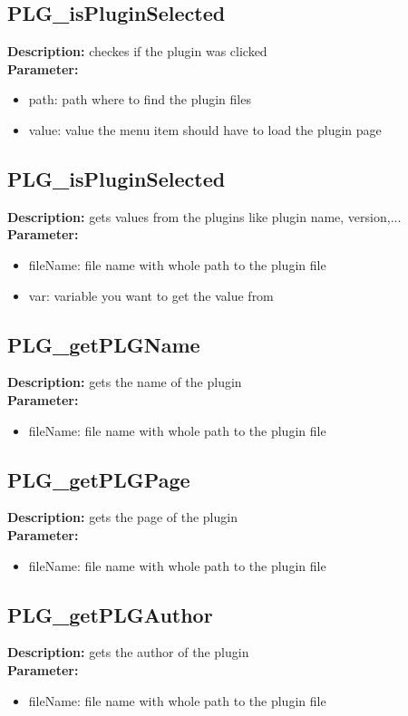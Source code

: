 \subsection{PLG\_isPluginSelected}
\textbf{Description:} checkes if the plugin was clicked\\
\textbf{Parameter:}
\begin{itemize}
\item path: path where to find the plugin files
\item value: value the menu item should have to load the plugin page
\end{itemize}

\subsection{PLG\_isPluginSelected}
\textbf{Description:} gets values from the plugins like plugin name, version,...\\
\textbf{Parameter:}
\begin{itemize}
\item fileName: file name with whole path to the plugin file
\item var: variable you want to get the value from
\end{itemize}

\subsection{PLG\_getPLGName}
\textbf{Description:} gets the name of the plugin\\
\textbf{Parameter:}
\begin{itemize}
\item fileName: file name with whole path to the plugin file
\end{itemize}

\subsection{PLG\_getPLGPage}
\textbf{Description:} gets the page of the plugin\\
\textbf{Parameter:}
\begin{itemize}
\item fileName: file name with whole path to the plugin file
\end{itemize}

\subsection{PLG\_getPLGAuthor}
\textbf{Description:} gets the author of the plugin\\
\textbf{Parameter:}
\begin{itemize}
\item fileName: file name with whole path to the plugin file
\end{itemize}

